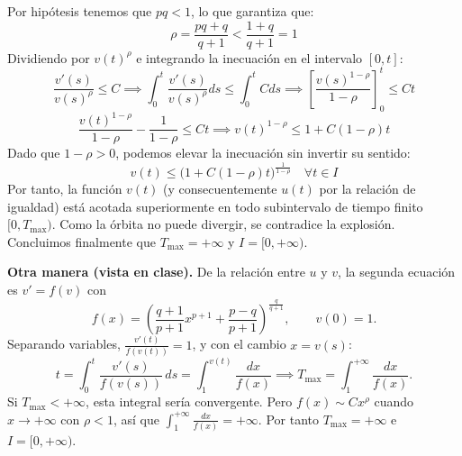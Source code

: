 {    Por hipótesis tenemos que $pq < 1$, lo que garantiza que:
    \[
        \rho = \frac{pq+q}{q+1} < \frac{1+q}{q+1} = 1
    \]
    Dividiendo por $v(t)^\rho$ e integrando la inecuación en el intervalo $[0, t]$:
    \[
        \frac{v'(s)}{v(s)^\rho} \le C \implies \int_0^t \frac{v'(s)}{v(s)^\rho} ds \le \int_0^t C ds \implies \left[ \frac{v(s)^{1-\rho}}{1-\rho} \right]_0^t \le C t
    \]
    \[
        \frac{v(t)^{1-\rho}}{1-\rho} - \frac{1}{1-\rho} \le C t \implies v(t)^{1-\rho} \le 1 + C (1-\rho) t
    \]
    Dado que $1-\rho > 0$, podemos elevar la inecuación sin invertir su sentido:
    \[
        v(t) \le \Big( 1 + C (1-\rho) t \Big)^{\frac{1}{1-\rho}} \quad \forall t \in I
    \]
    Por tanto, la función $v(t)$ (y consecuentemente $u(t)$ por la relación de igualdad) está acotada superiormente en todo subintervalo de tiempo finito $[0, T_{\max})$. Como la órbita no puede divergir, se contradice la explosión. Concluimos finalmente que $T_{\max} = +\infty$ y $I = [0, +\infty)$.

    \textbf{Otra manera (vista en clase).} De la relación entre $u$ y $v$, la segunda ecuación es $v' = f(v)$ con
    \[
        f(x) = \left( \frac{q+1}{p+1} x^{p+1} + \frac{p-q}{p+1} \right)^{\frac{q}{q+1}}, \qquad v(0) = 1.
    \]
    Separando variables, $\frac{v'(t)}{f(v(t))} = 1$, y con el cambio $x = v(s)$:
    \[
        t = \int_0^t \frac{v'(s)}{f(v(s))} \, ds = \int_1^{v(t)} \frac{dx}{f(x)} \implies T_{\max} = \int_1^{+\infty} \frac{dx}{f(x)}.
    \]
    Si $T_{\max} < +\infty$, esta integral sería convergente. Pero $f(x) \sim C x^{\rho}$ cuando $x \to +\infty$ con $\rho < 1$, así que $\int_1^{+\infty} \frac{dx}{f(x)} = +\infty$. Por tanto $T_{\max} = +\infty$ e $I = [0, +\infty)$.
}

